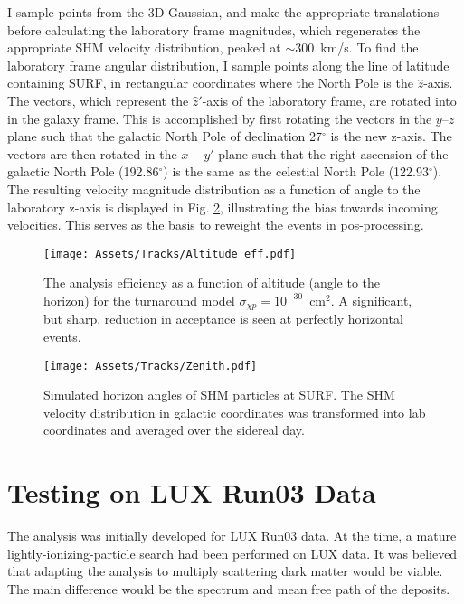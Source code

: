 I sample points from the 3D Gaussian, and make the appropriate translations before calculating the laboratory frame magnitudes, which regenerates the appropriate SHM velocity distribution, peaked at $\sim 300$~km/s.
To find the laboratory frame angular distribution, I sample points along the line of latitude containing SURF, in rectangular coordinates where the North Pole is the $\hat z$-axis.
The vectors, which represent the $\hat z '$-axis of the laboratory frame,  are rotated into in the galaxy frame.
This is accomplished by first rotating the vectors in the $y\text{--}z$ plane such that the galactic North Pole of declination 27$^\circ$\cite{blaauw_new_1960} is the new z-axis.
The vectors are then rotated in the $x-y'$ plane such that the right ascension of the galactic North Pole (192.86$^\circ$) is the same as the celestial North Pole (122.93$^\circ$).
The resulting velocity magnitude distribution as a function of angle to the laboratory z-axis is displayed in Fig. \ref{fig:zenith}, illustrating the bias towards incoming velocities.
This serves as the basis to reweight the events in pos-processing.


\begin{figure}
    \centering
    \texttt{[image: Assets/Tracks/Altitude\_eff.pdf]}
    \caption[The analysis efficiency as a function of altitude (angle to the horizon) for the turnaround model $\sigma_{\chi p} = 10^{-30}$~cm$^2$.]%
    {The analysis efficiency as a function of altitude (angle to the horizon) for the turnaround model $\sigma_{\chi p} = 10^{-30}$~cm$^2$.
    A significant, but sharp, reduction in acceptance is seen at perfectly horizontal events.}
    \label{fig:incident_velocity}
\end{figure}
\begin{figure}
    \centering
    \texttt{[image: Assets/Tracks/Zenith.pdf]}
    \caption[Simulated horizon angles of SHM particles at SURF.]%
    {Simulated horizon angles of SHM particles at SURF. The SHM velocity distribution in galactic coordinates was transformed into lab coordinates and averaged over the sidereal day. }
    \label{fig:zenith}
\end{figure}
\afterpage{\FloatBarrier}
\section{Testing on LUX Run03 Data}

The analysis was initially developed for LUX Run03 data.
At the time, a mature lightly-ionizing-particle search had been performed on LUX data\cite{kamdin_search_2018}.
It was believed that adapting the analysis to multiply scattering dark matter would be viable. 
The main difference would be the spectrum and mean free path of the deposits.

